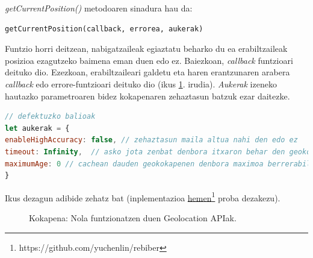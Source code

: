 \textit{getCurrentPosition()}  metodoaren sinadura hau da:

\begin{lstlisting}[numbers=none]
getCurrentPosition(callback, errorea, aukerak)   
\end{lstlisting}


Funtzio horri deitzean, nabigatzaileak egiaztatu beharko du ea erabiltzaileak posizioa ezagutzeko baimena eman duen edo ez. Baiezkoan, \textit{callback} funtzioari deituko dio. Ezezkoan, erabiltzaileari galdetu eta haren erantzunaren arabera \textit{callback} edo errore-funtzioari deituko dio (ikus \ref{fig:geolocationapi}. irudia). \textit{Aukerak} izeneko hautazko parametroaren bidez kokapenaren zehaztasun batzuk ezar daitezke.

\begin{lstlisting}[numbers=none,language=JavaScript]
// defektuzko balioak 
let aukerak = {
enableHighAccuracy: false, // zehaztasun maila altua nahi den edo ez
timeout: Infinity,  // asko jota zenbat denbora itxaron behar den geokokapena lortzen errorerik eman gabe
maximumAge: 0 // cachean dauden geokokapenen denbora maximoa berrerabiliak ahal izateko, milisegundutan. 0 = ez erabili cachea
}
\end{lstlisting}

Ikus dezagun adibide zehatz bat (inplementazioa \href{https://codesandbox.io/s/geokokapena-v9vbz?file=/index.html}{hemen\footnote{https://github.com/yuchenlin/rebiber}} proba dezakezu).

\begin{figure}[ht]
	\centering
{}
\caption{Kokapena: Nola funtzionatzen duen Geolocation  APIak.}
\label{fig:geolocationapi}
\end{figure}

